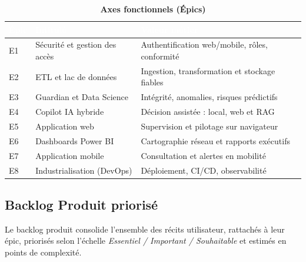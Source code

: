 \documentclass[12pt,a4paper]{report}
\newcommand{\TableHeaderCell}[1]{\cellcolor{black}\textcolor{white}{\textbf{#1}}}
\begin{document}
\begin{table}[H]\centering
\caption{\textbf{Axes fonctionnels (Épics)}}
\label{tab:epics}
\renewcommand{\arraystretch}{1.3}
\small
\begin{tabular}{|>{\centering\arraybackslash}p{1.3cm}|p{5.8cm}|p{6.2cm}|}
\hline
\TableHeaderCell{Épic} & \TableHeaderCell{Intitulé} & \TableHeaderCell{Valeur métier} \\ \hline
E1 & Sécurité et gestion des accès & Authentification web/mobile, rôles, conformité \\ \hline
E2 & ETL et lac de données & Ingestion, transformation et stockage fiables \\ \hline
E3 & Guardian et Data Science & Intégrité, anomalies, risques prédictifs \\ \hline
E4 & Copilot IA hybride & Décision assistée : local, web et RAG \\ \hline
E5 & Application web & Supervision et pilotage sur navigateur \\ \hline
E6 & Dashboards Power BI & Cartographie réseau et rapports exécutifs \\ \hline
E7 & Application mobile & Consultation et alertes en mobilité \\ \hline
E8 & Industrialisation (DevOps) & Déploiement, CI/CD, observabilité \\ \hline
\end{tabular}
\end{table}

\subsection{Backlog Produit priorisé}

Le backlog produit consolide l'ensemble des récits utilisateur, rattachés à leur épic, priorisés selon l'échelle \textit{Essentiel / Important / Souhaitable} et estimés en points de complexité.
\end{document}
